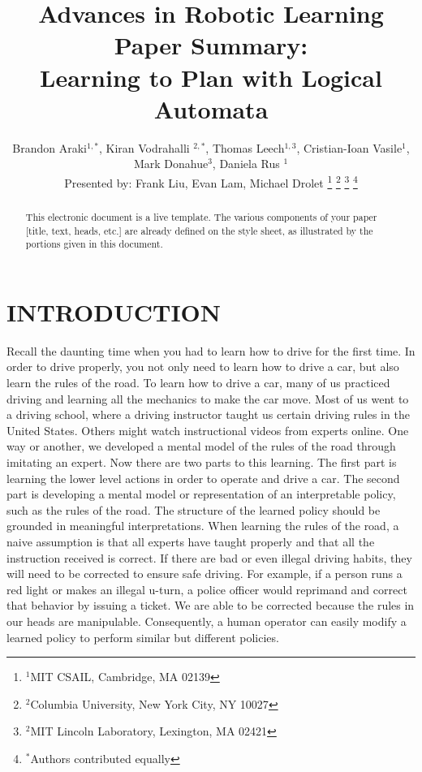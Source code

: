 \documentclass[letterpaper, 10 pt, conference]{ieeeconf}  %
\title{\LARGE \bf
Advances in Robotic Learning Paper Summary: \\
Learning to Plan with Logical Automata
}
\author{Brandon Araki$^{1,*}$, Kiran Vodrahalli $^{2,*}$, Thomas Leech$^{1,3}$, Cristian-Ioan Vasile$^{1}$, Mark Donahue$^{3}$, Daniela Rus $^{1}$ \\
Presented by: Frank Liu, Evan Lam, Michael Drolet
\thanks{$^{1}$MIT CSAIL, Cambridge, MA 02139}%
\thanks{$^{2}$Columbia University, New York City, NY 10027 }%
\thanks{$^{2}$MIT Lincoln Laboratory, Lexington, MA 02421}%
\thanks{$^{*}$Authors contributed equally}%
}
\begin{document}
\maketitle
\thispagestyle{empty}
\pagestyle{empty}


\begin{abstract}

This electronic document is a live template. The various components of your paper [title, text, heads, etc.] are already defined on the style sheet, as illustrated by the portions given in this document.

\end{abstract}


\section{INTRODUCTION}
Recall the daunting time when you had to learn how to drive for the first time. In order to drive properly, you not only need to learn how to drive a car, but also learn the rules of the road. To learn how to drive a car, many of us practiced driving and learning all the mechanics to make the car move. Most of us went to a driving school, where a driving instructor taught us certain driving rules in the United States. Others might watch instructional videos from experts online. One way or another, we developed a mental model of the rules of the road through imitating an expert.
\newline
\indent Now there are two parts to this learning. The first part is learning the lower level actions in order to operate and drive a car. The second part is developing a mental model or representation of an interpretable policy, such as the rules of the road. The structure of the learned policy should be grounded in meaningful interpretations.
\newline
\indent When learning the rules of the road, a naive assumption is that all experts have taught properly and that all the instruction received is correct. If there are bad or even illegal driving habits, they will need to be corrected to ensure safe driving. For example, if a person runs a red light or makes an illegal u-turn, a police officer would reprimand and correct that behavior by issuing a ticket. We are able to be corrected because the rules in our heads are manipulable. Consequently, a human operator can easily modify a learned policy to perform similar but different policies. 
\end{document}
